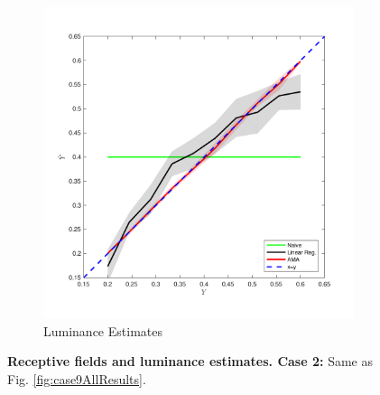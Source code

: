\documentclass{jov}
\begin{document}
\begin{figure}
        \begin{subfigure}[b]{0.2 \textwidth}
        \includegraphics[width=\textwidth]{../Figures/Figure11/Figure11_c.pdf}
        \caption{Luminance Estimates}
        \label{fig:case10Results}
    \end{subfigure}
    \caption{{\bf Receptive fields and luminance estimates. Case 2:} Same as Fig. \ref{fig:case9AllResults}.}
    \label{fig:case10AllResults}
\end{figure}
\end{document}
